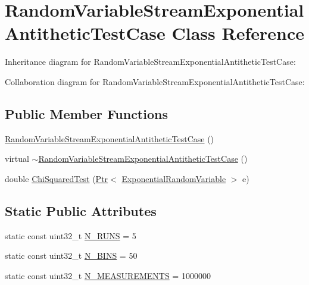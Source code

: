 \hypertarget{classRandomVariableStreamExponentialAntitheticTestCase}{}\section{Random\+Variable\+Stream\+Exponential\+Antithetic\+Test\+Case Class Reference}
\label{classRandomVariableStreamExponentialAntitheticTestCase}


Inheritance diagram for Random\+Variable\+Stream\+Exponential\+Antithetic\+Test\+Case\+:


Collaboration diagram for Random\+Variable\+Stream\+Exponential\+Antithetic\+Test\+Case\+:
\subsection*{Public Member Functions}
\begin{DoxyCompactItemize}
\item 
\hyperlink{classRandomVariableStreamExponentialAntitheticTestCase_ad459524d32d3b91a37b167f6a73aca66}{Random\+Variable\+Stream\+Exponential\+Antithetic\+Test\+Case} ()
\item 
virtual \hyperlink{classRandomVariableStreamExponentialAntitheticTestCase_a117487fd0065b0a77958e184e8c7b329}{$\sim$\+Random\+Variable\+Stream\+Exponential\+Antithetic\+Test\+Case} ()
\item 
double \hyperlink{classRandomVariableStreamExponentialAntitheticTestCase_a09f3e59c6175e60b09cfcb5ba650a86b}{Chi\+Squared\+Test} (\hyperlink{classns3_1_1Ptr}{Ptr}$<$ \hyperlink{classns3_1_1ExponentialRandomVariable}{Exponential\+Random\+Variable} $>$ e)
\end{DoxyCompactItemize}
\subsection*{Static Public Attributes}
\begin{DoxyCompactItemize}
\item 
static const uint32\+\_\+t \hyperlink{classRandomVariableStreamExponentialAntitheticTestCase_ae6a025b7e35adcd815a269e2882dbfa8}{N\+\_\+\+R\+U\+NS} = 5
\item 
static const uint32\+\_\+t \hyperlink{classRandomVariableStreamExponentialAntitheticTestCase_a7ffc40bce73013db87de6e45a5f1851e}{N\+\_\+\+B\+I\+NS} = 50
\item 
static const uint32\+\_\+t \hyperlink{classRandomVariableStreamExponentialAntitheticTestCase_a89d8b361cf56ca21687d35b0a7a89057}{N\+\_\+\+M\+E\+A\+S\+U\+R\+E\+M\+E\+N\+TS} = 1000000
\end{DoxyCompactItemize}
